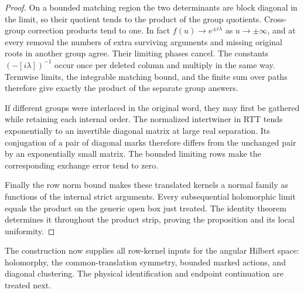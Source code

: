 \begin{proof}
On a bounded matching region the two determinants are block
diagonal in the limit, so their quotient tends to the product of
the group quotients.  Cross-group correction products tend to
one.  In fact $f(u)\to e^{\pm i\lambda}$ as
$u\to\pm\infty$, and at every removal the numbers of extra
surviving arguments and missing original roots in another group
agree.  Their limiting phases cancel.  The constants
$(-[i\lambda])^{-1}$ occur once per deleted column and multiply
in the same way.  Termwise limits, the integrable matching bound,
and the finite sum over paths therefore give exactly the product
of the separate group answers.

If different groups were interlaced in the original word, they
may first be gathered while retaining each internal order.
The normalized intertwiner in RTT tends exponentially to an
invertible diagonal matrix at large real separation.
Its conjugation of a pair of diagonal marks therefore differs
from the unchanged pair by an exponentially small matrix.
The bounded limiting rows make the corresponding exchange error
tend to zero.

Finally the row norm bound makes these translated kernels a
normal family as functions of the internal strict arguments.
Every subsequential holomorphic limit equals the product on the
generic open box just treated.  The identity theorem determines
it throughout the product strip, proving the proposition and
its local uniformity.
\end{proof}

The construction now supplies all row-kernel inputs for the
angular Hilbert space: holomorphy, the common-translation
symmetry, bounded marked actions, and diagonal clustering.
The physical identification and endpoint continuation are
treated next.
